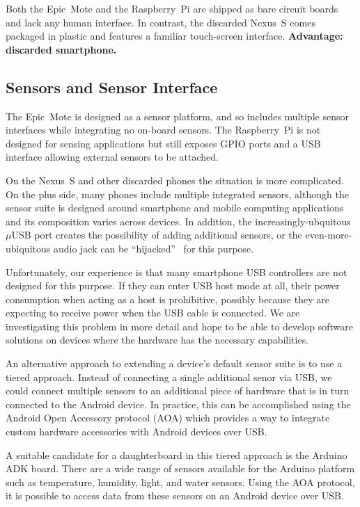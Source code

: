 Both the Epic~Mote and the Raspberry~Pi are shipped as bare circuit boards
and lack any human interface. In contrast, the discarded Nexus~S comes
packaged in plastic and features a familiar touch-screen interface.
\textbf{Advantage: discarded smartphone.}

\subsection{Sensors and Sensor Interface}

The Epic~Mote is designed as a sensor platform, and so includes multiple
sensor interfaces while integrating no on-board sensors. The Raspberry~Pi is
not designed for sensing applications but still exposes GPIO ports and a USB
interface allowing external sensors to be attached.

On the Nexus~S and other discarded phones the situation is more complicated. On
the plus side, many phones include multiple integrated sensors, although the
sensor suite is designed around smartphone and mobile computing applications
and its composition varies across devices. In addition, the
increasingly-ubquitous $\mu$USB port creates the possibility of adding
additional sensors, or the even-more-ubiquitous audio jack can be
``hijacked''~\cite{hijack-dev10} for this purpose.

Unfortunately, our experience is that many smartphone USB controllers are not
designed for this purpose. If they can enter USB host mode at all, their
power consumption when acting as a host is prohibitive, possibly because they
are expecting to receive power when the USB cable is connected. We are
investigating this problem in more detail and hope to be able to develop
software solutions on devices where the hardware has the necessary
capabilities.

An alternative approach to extending a device's default sensor suite is to
use a tiered approach.  Instead of connecting a single additional senor via
USB, we could connect multiple sensors to an additional piece of hardware that
is in turn connected to the Android device. In practice, this can be
accomplished using the Android Open Accessory protocol (AOA) which provides a
way to integrate custom hardware accessories with Android devices over USB.

A suitable candidate for a daughterboard in this tiered approach is the Arduino
ADK board. There are a wide range of sensors available for the Arduino platform
such as temperature, humidity, light, and water sensors. Using the AOA protocol,
it is possible to access data from these sensors on an Android device over USB.

